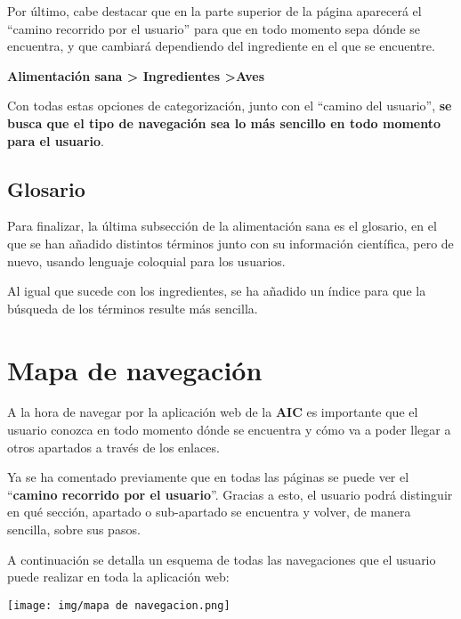 \documentclass{\ClassPath/viu-tfm-template}
\begin{document}
Por último, cabe destacar que en la parte superior de la página aparecerá el “camino recorrido por el usuario” para que en todo momento sepa dónde se encuentra, y que cambiará dependiendo del ingrediente en el que se encuentre.

\begin{center}
    \vspace{-10pt}
    \textbf{{\color{maincolor}Alimentación sana > \space Ingredientes} >\space Aves}
    \vspace{-15pt}
\end{center}

Con todas estas opciones de categorización, junto con el “camino del usuario”, \textbf{se busca que el tipo de navegación sea lo más sencillo en todo momento para el usuario}.


\section{Glosario}
Para finalizar, la última subsección de la alimentación sana es el glosario, en el que se han añadido distintos términos junto con su información científica, pero de nuevo, usando lenguaje coloquial para los usuarios.

Al igual que sucede con los ingredientes, se ha añadido un índice para que la búsqueda de los términos resulte más sencilla.



\chapter{Mapa de navegación}
A la hora de navegar por la aplicación web de la \textbf{AIC} es importante que el usuario conozca en todo momento dónde se encuentra y cómo va a poder llegar a otros apartados a través de los enlaces.

Ya se ha comentado previamente que en todas las páginas se puede ver el “\textbf{camino recorrido por el usuario}”. Gracias a esto, el usuario podrá distinguir en qué sección, apartado o sub-apartado se encuentra y volver, de manera sencilla, sobre sus pasos.

A continuación se detalla un esquema de todas las navegaciones que el usuario puede realizar en toda la aplicación web:

\begin{center}
    \vspace{-10pt}
    \texttt{[image: img/mapa de navegacion.png]}
    \vspace{-20pt}
\end{center}
\end{document}
